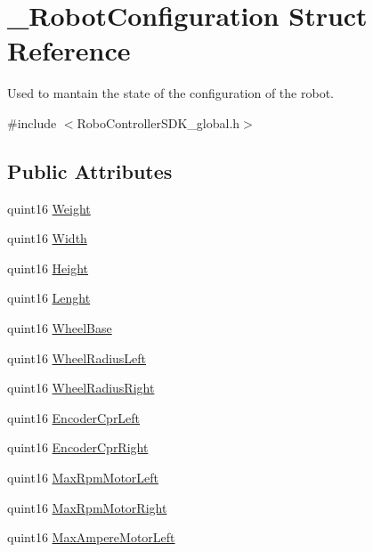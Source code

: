 \hypertarget{struct___robot_configuration}{\section{\-\_\-\-Robot\-Configuration Struct Reference}
\label{struct___robot_configuration}
}


Used to mantain the state of the configuration of the robot.  




{\ttfamily \#include $<$Robo\-Controller\-S\-D\-K\-\_\-global.\-h$>$}

\subsection*{Public Attributes}
\begin{DoxyCompactItemize}
\item 
quint16 \hyperlink{struct___robot_configuration_a9aa2a32a66e3d9559e9b43ccef43e74b}{Weight}
\item 
quint16 \hyperlink{struct___robot_configuration_ab9fcfe56d6fe56d0e7738e51dbcd062b}{Width}
\item 
quint16 \hyperlink{struct___robot_configuration_afb09adbb9fd458bb18c9aa2dd25b9be0}{Height}
\item 
quint16 \hyperlink{struct___robot_configuration_ab61562623c27b882ecb55262336efb96}{Lenght}
\item 
quint16 \hyperlink{struct___robot_configuration_ad18b7c6607d189b0507c67f584d7213c}{Wheel\-Base}
\item 
quint16 \hyperlink{struct___robot_configuration_a4fba24bbead4c38e30182570a9fc111b}{Wheel\-Radius\-Left}
\item 
quint16 \hyperlink{struct___robot_configuration_a0cd7d7ca4eea7abb6c751f16a268a22c}{Wheel\-Radius\-Right}
\item 
quint16 \hyperlink{struct___robot_configuration_af182347d3c875e986ba720760ef55a54}{Encoder\-Cpr\-Left}
\item 
quint16 \hyperlink{struct___robot_configuration_a63e2c47bb9763838aa3b1b097890a5a5}{Encoder\-Cpr\-Right}
\item 
quint16 \hyperlink{struct___robot_configuration_a2a12b5f279876cf7dac9ab2d1129d793}{Max\-Rpm\-Motor\-Left}
\item 
quint16 \hyperlink{struct___robot_configuration_a410e871a1f0c5d0a9a06f57f584b1407}{Max\-Rpm\-Motor\-Right}
\item 
quint16 \hyperlink{struct___robot_configuration_ab7e58c3cd60604b5965a432eb3e483a4}{Max\-Ampere\-Motor\-Left}

\end{DoxyCompactItemize}
